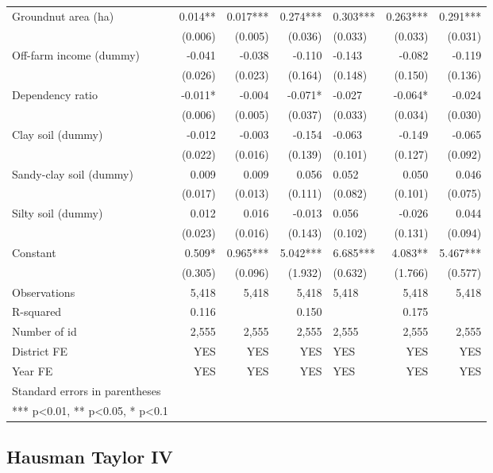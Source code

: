 \documentclass[
]{article}
\begin{document}
\begin{landscape}
\begin{longtable}[t]{lrrrlrr}
Groundnut area (ha) & 0.014** & 0.017*** & 0.274*** & 0.303*** & 0.263*** & 0.291***\\
\addlinespace
 & (0.006) & (0.005) & (0.036) & (0.033) & (0.033) & (0.031)\\
Off-farm income (dummy) & -0.041 & -0.038 & -0.110 & -0.143 & -0.082 & -0.119\\
 & (0.026) & (0.023) & (0.164) & (0.148) & (0.150) & (0.136)\\
Dependency ratio & -0.011* & -0.004 & -0.071* & -0.027 & -0.064* & -0.024\\
 & (0.006) & (0.005) & (0.037) & (0.033) & (0.034) & (0.030)\\
\addlinespace
Clay soil (dummy) & -0.012 & -0.003 & -0.154 & -0.063 & -0.149 & -0.065\\
 & (0.022) & (0.016) & (0.139) & (0.101) & (0.127) & (0.092)\\
Sandy-clay soil (dummy) & 0.009 & 0.009 & 0.056 & 0.052 & 0.050 & 0.046\\
 & (0.017) & (0.013) & (0.111) & (0.082) & (0.101) & (0.075)\\
Silty soil (dummy) & 0.012 & 0.016 & -0.013 & 0.056 & -0.026 & 0.044\\
\addlinespace
 & (0.023) & (0.016) & (0.143) & (0.102) & (0.131) & (0.094)\\
Constant & 0.509* & 0.965*** & 5.042*** & 6.685*** & 4.083** & 5.467***\\
 & (0.305) & (0.096) & (1.932) & (0.632) & (1.766) & (0.577)\\
Observations & 5,418 & 5,418 & 5,418 & 5,418 & 5,418 & 5,418\\
R-squared & 0.116 &  & 0.150 &  & 0.175 & \\
\addlinespace
Number of id & 2,555 & 2,555 & 2,555 & 2,555 & 2,555 & 2,555\\
District FE & YES & YES & YES & YES & YES & YES\\
Year FE & YES & YES & YES & YES & YES & YES\\
Standard errors in parentheses &  &  &  &  &  & \\
*** p<0.01, ** p<0.05, * p<0.1 &  &  &  &  &  & \\*
\end{longtable}
\endgroup{}
\end{landscape}
\newpage

\hypertarget{hausman-taylor-iv}{%
\subsection{Hausman Taylor IV}\label{hausman-taylor-iv}}
\end{document}
